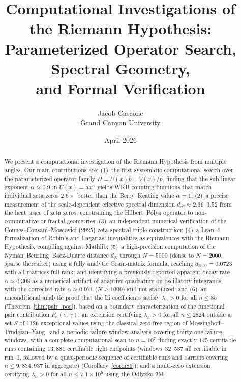 \documentclass[11pt]{article}
\title{Computational Investigations of the Riemann Hypothesis:\\
Parameterized Operator Search, Spectral Geometry,\\
and Formal Verification}
\author{Jacob Cascone\\
\small Grand Canyon University}
\date{April 2026}
\begin{document}
\maketitle

\begin{abstract}
We present a computational investigation of the Riemann Hypothesis from multiple angles.
Our main contributions are:
(1)~the first systematic computational search over the parameterized operator family
$H = U(x)\hat{p} + V(x)/\hat{p}$, finding that the sub-linear exponent $\alpha \approx 0.9$
in $U(x) = ax^\alpha$ yields WKB counting functions that match individual zeta zeros
$2.6\times$ better than the Berry--Keating value $\alpha = 1$;
(2)~a precise measurement of the scale-dependent effective spectral dimension
$d_{\mathrm{eff}} \approx 2.36$--$3.52$ from the heat trace of zeta zeros, constraining
the Hilbert--P\'olya operator to non-commutative or fractal geometries;
(3)~an independent numerical verification of the Connes--Consani--Moscovici (2025)
zeta spectral triple construction;
(4)~a Lean~4 formalization of Robin's and Lagarias' inequalities as equivalences
with the Riemann Hypothesis, compiling against Mathlib;
(5)~a high-precision computation of the Nyman--Beurling--Ba\'ez-Duarte distance $d_N$
through $N = 5000$ (dense to $N=2000$, sparse thereafter) using a fully analytic Gram-matrix
formula, reaching $d_{5000} = 0.0723$ with all matrices full rank; and identifying a
previously reported apparent decay rate $\alpha \approx 0.308$ as a numerical artifact of
adaptive quadrature on oscillatory integrands, with the corrected rate $\alpha \approx 0.071$
($N \ge 1000$) still not stabilized; and
(6)~an unconditional analytic proof that the Li coefficients satisfy $\lambda_n > 0$
for all $n \leq 85$ (Theorem~\ref{thm:pair_pos}), based on a boundary characterization
of the functional pair contribution $F_n(\sigma,\gamma)$; an extension certifying
$\lambda_n > 0$ for all $n \leq 2824$ outside a set $S$ of 1126 exceptional values
using the classical zero-free region of
Mossinghoff--Trudgian--Yang~\cite{mty2022} and a periodic failure-window analysis
covering thirty-one failure windows, with a complete computational scan to $n = 10^7$
finding exactly $145$ certifiable runs containing $13{,}881$ certifiable right endpoints
(windows~32--537 all certifiable in run~1, followed by a quasi-periodic sequence of
certifiable runs and barriers covering $n \leq 9{,}834{,}937$ in aggregate)
(Corollary~\ref{cor:n86}); and a multi-zero extension
certifying $\lambda_n > 0$ for all $n \le 7.1 \times 10^6$ using the Odlyzko 2M

\end{abstract}
\end{document}
